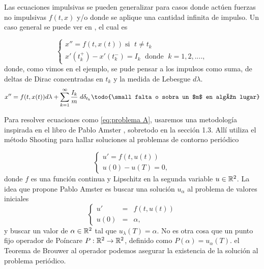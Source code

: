 Las ecuaciones impulsivas se pueden generalizar para casos donde actúen fuerzas no impulsivas $f(t,x)$ y/o donde se aplique una cantidad infinita de impulso. Un caso general se puede ver en \cite{Bainov}, el cual es

	\begin{equation*}
		\left\lbrace \begin{array}{l}
			x''=f(t,x(t)) \; \text{si }\; t\neq t_k\\
			 x'(t_k^+)-x'(t_k^-)=I_k \; \text{ donde }\; k=1,2,....,
		\end{array}\right. 
	\end{equation*}
donde, como vimos en el ejemplo, se pude pensar a los impulsos como suma, de deltas de Dirac concentradas en $t_k$ y la medida de Lebesgue $d\lambda$.  
\reversemarginpar
$$x''=f(t,x(t)) d\lambda +\sum_{k=1}^{\infty}\dfrac{I_k}{m}\;d\delta_{t_k}\textrm{\todo{\small falta o sobra un $m$ en algún lugar}}$$

Para resolver ecuaciones como \ref{eq:problema A}, usaremos una metodología inspirada en el libro de Pablo Amster \cite{Amster}, sobretodo en la sección 1.3. Allí utiliza el método Shooting para hallar soluciones al problemas de contorno periódico 

	\begin{equation*}
		\left\lbrace \begin{array}{l}
			u'=f(t,u(t))\\
			u(0)-u(T)=0,
		\end{array}\right. 
	\end{equation*}
donde $f$ es una función continua y Lipschitz en la segunda variable $u\in\mathbb{R}^2$.  La idea que propone Pablo Amster es buscar una solución $u_\alpha$ al problema de valores iniciales 
	\begin{equation*}
	\left\lbrace \begin{array}{lcl}
		u'&=&f(t,u(t))\\
		u(0)&=&\alpha,
	\end{array}\right. 
\end{equation*}
y buscar un valor de $\alpha\in\mathbb{R}^2$ tal que $u_\lambda(T)=\alpha$. No es otra cosa que un punto fijo  operador  de Poíncare\deleted{)} $P:\mathbb{R}^2\to \mathbb{R}^2$, definido como $P(\alpha)=u_\alpha(T)$.  el Teorema de Brouwer \cite{Amster} al operador  podemos asegurar la existencia de la solución al problema periódico. 

